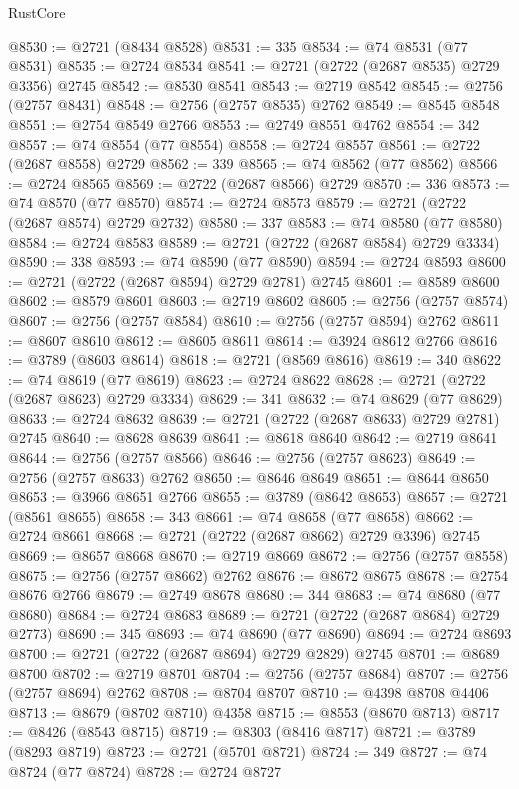 \begin{lexlean}{RustCore}
\begin{coremodule}
@8530 := @2721 (@8434 @8528)
@8531 := 335
@8534 := @74 @8531 (@77 @8531)
@8535 := @2724 @8534
@8541 := @2721 (@2722 (@2687 @8535) @2729 @3356) @2745
@8542 := @8530 @8541
@8543 := @2719 @8542
@8545 := @2756 (@2757 @8431)
@8548 := @2756 (@2757 @8535) @2762
@8549 := @8545 @8548
@8551 := @2754 @8549 @2766
@8553 := @2749 @8551 @4762
@8554 := 342
@8557 := @74 @8554 (@77 @8554)
@8558 := @2724 @8557
@8561 := @2722 (@2687 @8558) @2729
@8562 := 339
@8565 := @74 @8562 (@77 @8562)
@8566 := @2724 @8565
@8569 := @2722 (@2687 @8566) @2729
@8570 := 336
@8573 := @74 @8570 (@77 @8570)
@8574 := @2724 @8573
@8579 := @2721 (@2722 (@2687 @8574) @2729 @2732)
@8580 := 337
@8583 := @74 @8580 (@77 @8580)
@8584 := @2724 @8583
@8589 := @2721 (@2722 (@2687 @8584) @2729 @3334)
@8590 := 338
@8593 := @74 @8590 (@77 @8590)
@8594 := @2724 @8593
@8600 := @2721 (@2722 (@2687 @8594) @2729 @2781) @2745
@8601 := @8589 @8600
@8602 := @8579 @8601
@8603 := @2719 @8602
@8605 := @2756 (@2757 @8574)
@8607 := @2756 (@2757 @8584)
@8610 := @2756 (@2757 @8594) @2762
@8611 := @8607 @8610
@8612 := @8605 @8611
@8614 := @3924 @8612 @2766
@8616 := @3789 (@8603 @8614)
@8618 := @2721 (@8569 @8616)
@8619 := 340
@8622 := @74 @8619 (@77 @8619)
@8623 := @2724 @8622
@8628 := @2721 (@2722 (@2687 @8623) @2729 @3334)
@8629 := 341
@8632 := @74 @8629 (@77 @8629)
@8633 := @2724 @8632
@8639 := @2721 (@2722 (@2687 @8633) @2729 @2781) @2745
@8640 := @8628 @8639
@8641 := @8618 @8640
@8642 := @2719 @8641
@8644 := @2756 (@2757 @8566)
@8646 := @2756 (@2757 @8623)
@8649 := @2756 (@2757 @8633) @2762
@8650 := @8646 @8649
@8651 := @8644 @8650
@8653 := @3966 @8651 @2766
@8655 := @3789 (@8642 @8653)
@8657 := @2721 (@8561 @8655)
@8658 := 343
@8661 := @74 @8658 (@77 @8658)
@8662 := @2724 @8661
@8668 := @2721 (@2722 (@2687 @8662) @2729 @3396) @2745
@8669 := @8657 @8668
@8670 := @2719 @8669
@8672 := @2756 (@2757 @8558)
@8675 := @2756 (@2757 @8662) @2762
@8676 := @8672 @8675
@8678 := @2754 @8676 @2766
@8679 := @2749 @8678
@8680 := 344
@8683 := @74 @8680 (@77 @8680)
@8684 := @2724 @8683
@8689 := @2721 (@2722 (@2687 @8684) @2729 @2773)
@8690 := 345
@8693 := @74 @8690 (@77 @8690)
@8694 := @2724 @8693
@8700 := @2721 (@2722 (@2687 @8694) @2729 @2829) @2745
@8701 := @8689 @8700
@8702 := @2719 @8701
@8704 := @2756 (@2757 @8684)
@8707 := @2756 (@2757 @8694) @2762
@8708 := @8704 @8707
@8710 := @4398 @8708 @4406
@8713 := @8679 (@8702 @8710) @4358
@8715 := @8553 (@8670 @8713)
@8717 := @8426 (@8543 @8715)
@8719 := @8303 (@8416 @8717)
@8721 := @3789 (@8293 @8719)
@8723 := @2721 (@5701 @8721)
@8724 := 349
@8727 := @74 @8724 (@77 @8724)
@8728 := @2724 @8727

\end{coremodule}
\end{lexlean}
